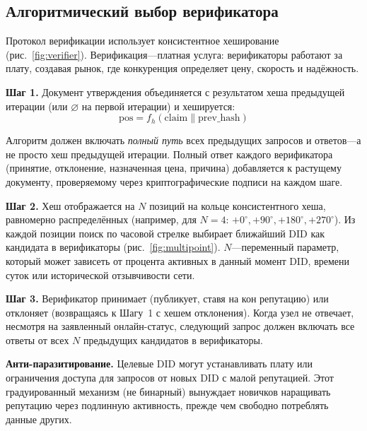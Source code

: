 \documentclass[11pt,a4paper,twocolumn]{article}
\begin{document}
\subsection{Алгоритмический выбор верификатора}

Протокол верификации использует консистентное хеширование~\cite{karger1997} (рис.~\ref{fig:verifier}). Верификация---платная услуга: верификаторы работают за плату, создавая рынок, где конкуренция определяет цену, скорость и надёжность.

\textbf{Шаг 1.} Документ утверждения объединяется с результатом хеша предыдущей итерации (или $\varnothing$ на первой итерации) и хешируется:
\begin{equation}
\text{pos} = f_h(\text{claim} \| \text{prev\_hash})
\label{eq:hash}
\end{equation}

Алгоритм должен включать \emph{полный путь} всех предыдущих запросов и ответов---а не просто хеш предыдущей итерации. Полный ответ каждого верификатора (принятие, отклонение, назначенная цена, причина) добавляется к растущему документу, проверяемому через криптографические подписи на каждом шаге.

\textbf{Шаг 2.} Хеш отображается на $N$ позиций на кольце консистентного хеша, равномерно распределённых (например, для $N=4$: $+0^{\circ}, +90^{\circ}, +180^{\circ}, +270^{\circ}$). Из каждой позиции поиск по часовой стрелке выбирает ближайший DID как кандидата в верификаторы (рис.~\ref{fig:multipoint}). $N$---переменный параметр, который может зависеть от процента активных в данный момент DID, времени суток или исторической отзывчивости сети.

\textbf{Шаг 3.} Верификатор принимает (публикует, ставя на кон репутацию) или отклоняет (возвращаясь к Шагу~1 с хешем отклонения). Когда узел не отвечает, несмотря на заявленный онлайн-статус, следующий запрос должен включать все ответы от всех $N$ предыдущих кандидатов в верификаторы.

\textbf{Анти-паразитирование.} Целевые DID могут устанавливать плату или ограничения доступа для запросов от новых DID с малой репутацией. Этот градуированный механизм (не бинарный) вынуждает новичков наращивать репутацию через подлинную активность, прежде чем свободно потреблять данные других.
\end{document}
